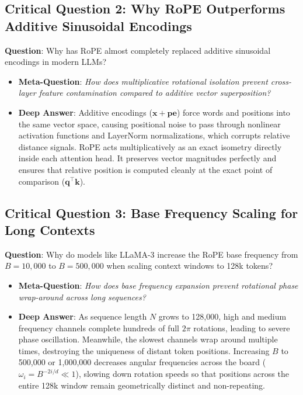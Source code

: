 \documentclass[11pt,a4paper]{article}
\theoremstyle{definition}
\begin{document}
\subsection{\textbf{Critical Question 2: Why RoPE Outperforms Additive Sinusoidal Encodings}}
\textbf{Question}: Why has RoPE almost completely replaced additive sinusoidal encodings in modern LLMs?
\begin{itemize}
    \item \textbf{Meta-Question}: \emph{How does multiplicative rotational isolation prevent cross-layer feature contamination compared to additive vector superposition?}
    \item \textbf{Deep Answer}: Additive encodings ($\mathbf{x} + \mathbf{pe}$) force words and positions into the same vector space, causing positional noise to pass through nonlinear activation functions and LayerNorm normalizations, which corrupts relative distance signals. RoPE acts multiplicatively as an exact isometry directly inside each attention head. It preserves vector magnitudes perfectly and ensures that relative position is computed cleanly at the exact point of comparison ($\mathbf{q}^\top \mathbf{k}$).
\end{itemize}

\subsection{\textbf{Critical Question 3: Base Frequency Scaling for Long Contexts}}
\textbf{Question}: Why do models like LLaMA-3 increase the RoPE base frequency from $B = 10,000$ to $B = 500,000$ when scaling context windows to 128k tokens?
\begin{itemize}
    \item \textbf{Meta-Question}: \emph{How does base frequency expansion prevent rotational phase wrap-around across long sequences?}
    \item \textbf{Deep Answer}: As sequence length $N$ grows to 128,000, high and medium frequency channels complete hundreds of full $2\pi$ rotations, leading to severe phase oscillation. Meanwhile, the slowest channels wrap around multiple times, destroying the uniqueness of distant token positions. Increasing $B$ to 500,000 or 1,000,000 decreases angular frequencies across the board ($\omega_i = B^{-2i/d} \ll 1$), slowing down rotation speeds so that positions across the entire 128k window remain geometrically distinct and non-repeating.
\end{itemize}
\end{document}
